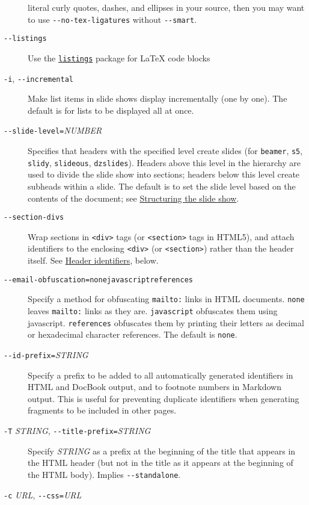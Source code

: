 \documentclass[]{article}
\begin{document}
\begin{description}
literal curly quotes, dashes, and ellipses in your source, then you may
want to use \texttt{-\/-no-tex-ligatures} without \texttt{-\/-smart}.
\item[\texttt{-\/-listings}]
Use the \href{https://ctan.org/pkg/listings}{\texttt{listings}} package
for LaTeX code blocks
\item[\texttt{-i}, \texttt{-\/-incremental}]
Make list items in slide shows display incrementally (one by one). The
default is for lists to be displayed all at once.
\item[\texttt{-\/-slide-level=}\emph{NUMBER}]
Specifies that headers with the specified level create slides (for
\texttt{beamer}, \texttt{s5}, \texttt{slidy}, \texttt{slideous},
\texttt{dzslides}). Headers above this level in the hierarchy are used
to divide the slide show into sections; headers below this level create
subheads within a slide. The default is to set the slide level based on
the contents of the document; see
\protect\hyperlink{structuring-the-slide-show}{Structuring the slide
show}.
\item[\texttt{-\/-section-divs}]
Wrap sections in \texttt{\textless{}div\textgreater{}} tags (or
\texttt{\textless{}section\textgreater{}} tags in HTML5), and attach
identifiers to the enclosing \texttt{\textless{}div\textgreater{}} (or
\texttt{\textless{}section\textgreater{}}) rather than the header
itself. See \protect\hyperlink{header-identifiers}{Header identifiers},
below.
\item[\texttt{-\/-email-obfuscation=none}\textbar{}\texttt{javascript}\textbar{}\texttt{references}]
Specify a method for obfuscating \texttt{mailto:} links in HTML
documents. \texttt{none} leaves \texttt{mailto:} links as they are.
\texttt{javascript} obfuscates them using javascript.
\texttt{references} obfuscates them by printing their letters as decimal
or hexadecimal character references. The default is \texttt{none}.
\item[\texttt{-\/-id-prefix=}\emph{STRING}]
Specify a prefix to be added to all automatically generated identifiers
in HTML and DocBook output, and to footnote numbers in Markdown output.
This is useful for preventing duplicate identifiers when generating
fragments to be included in other pages.
\item[\texttt{-T} \emph{STRING},
\texttt{-\/-title-prefix=}\emph{STRING}]
Specify \emph{STRING} as a prefix at the beginning of the title that
appears in the HTML header (but not in the title as it appears at the
beginning of the HTML body). Implies \texttt{-\/-standalone}.
\item[\texttt{-c} \emph{URL}, \texttt{-\/-css=}\emph{URL}]

\end{description}
\end{document}
